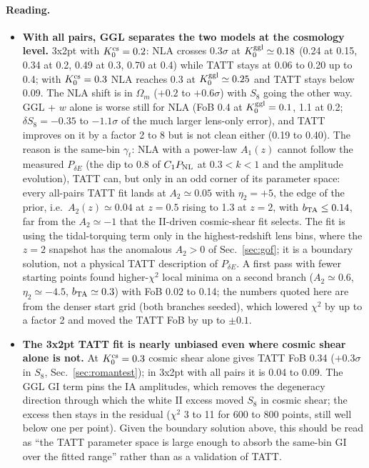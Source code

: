 \documentclass[11pt]{article}
\begin{document}
\paragraph{Reading.}
\begin{itemize}
\item \textbf{With all pairs, GGL separates the two models at the cosmology level.} 3x2pt with $K_0^{\rm cs} = 0.2$: NLA crosses $0.3\sigma$ at $K_0^{\rm ggl} \simeq 0.18$ (0.24 at 0.15, 0.34 at 0.2, 0.49 at 0.3, 0.70 at 0.4) while TATT stays at 0.06 to 0.20 up to 0.4; with $K_0^{\rm cs} = 0.3$ NLA reaches 0.3 at $K_0^{\rm ggl} \simeq 0.25$ and TATT stays below 0.09. The NLA shift is in $\Omega_m$ ($+0.2$ to $+0.6\sigma$) with $S_8$ going the other way. GGL + $w$ alone is worse still for NLA (FoB 0.4 at $K_0^{\rm ggl} = 0.1$, 1.1 at 0.2; $\delta S_8 = -0.35$ to $-1.1\sigma$ of the much larger lens-only error), and TATT improves on it by a factor 2 to 8 but is not clean either (0.19 to 0.40). The reason is the same-bin $\gamma_t$: NLA with a power-law $A_1(z)$ cannot follow the measured $P_{\delta E}$ (the dip to 0.8 of $C_1 P_{\rm NL}$ at $0.3 < k < 1$ and the amplitude evolution), TATT can, but only in an odd corner of its parameter space: every all-pairs TATT fit lands at $A_2 \simeq 0.05$ with $\eta_2 = +5$, the edge of the prior, i.e.\ $A_2(z) \simeq 0.04$ at $z = 0.5$ rising to 1.3 at $z = 2$, with $b_{\rm TA} \le 0.14$, far from the $A_2 \simeq -1$ that the II-driven cosmic-shear fit selects. The fit is using the tidal-torquing term only in the highest-redshift lens bins, where the $z = 2$ snapshot has the anomalous $A_2 > 0$ of Sec.~\ref{sec:gof}; it is a boundary solution, not a physical TATT description of $P_{\delta E}$. A first pass with fewer starting points found higher-$\chi^2$ local minima on a second branch ($A_2 \simeq 0.6$, $\eta_2 \simeq -4.5$, $b_{\rm TA} \simeq 0.3$) with FoB 0.02 to 0.14; the numbers quoted here are from the denser start grid (both branches seeded), which lowered $\chi^2$ by up to a factor 2 and moved the TATT FoB by up to $\pm0.1$.
\item \textbf{The 3x2pt TATT fit is nearly unbiased even where cosmic shear alone is not.} At $K_0^{\rm cs} = 0.3$ cosmic shear alone gives TATT FoB 0.34 ($+0.3\sigma$ in $S_8$, Sec.~\ref{sec:romantest}); in 3x2pt with all pairs it is 0.04 to 0.09. The GGL GI term pins the IA amplitudes, which removes the degeneracy direction through which the white II excess moved $S_8$ in cosmic shear; the excess then stays in the residual ($\chi^2$ 3 to 11 for 600 to 800 points, still well below one per point). Given the boundary solution above, this should be read as ``the TATT parameter space is large enough to absorb the same-bin GI over the fitted range'' rather than as a validation of TATT.

\end{itemize}
\end{document}
